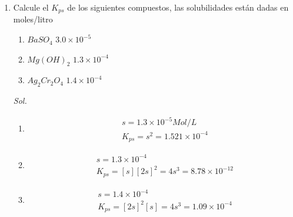 \begin{enumerate}
\item Calcule el $K_{ps}$ de los siguientes compuestos, las solubilidades están dadas en moles/litro
\begin{enumerate}
    \item $BaSO_4$ $3.0\times 10^{-5}$
    \item $Mg(OH)_2$ $1.3\times 10^{-4}$
    \item $Ag_2Cr_2O_4$ $1.4\times 10^{-4}$
\end{enumerate}

\textit{ Sol. }

\begin{enumerate}
\item \begin{align*}
             & s=1.3\times10^{-5}Mol/L       \\
             & K_{ps}=s^2=1.521\times10^{-4}
      \end{align*}
\item \begin{align*}
             & s=1.3\times10^{-4}                       \\
             & K_{ps}=[s][2s]^2=4s^3=8.78\times10^{-12}
      \end{align*}
\item \begin{align*}
             & s=1.4\times10^{-4}                      \\
             & K_{ps}=[2s]^2[s]=4s^3=1.09\times10^{-4}
          \end{align*}
\end{enumerate}



\end{enumerate}
